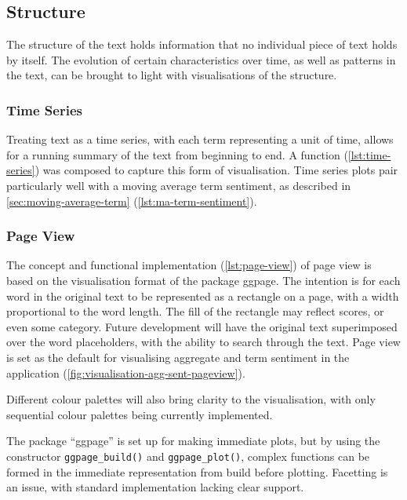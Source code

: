 \message{ !name(jason-cairns-dissertation.tex)}\documentclass[11pt, a4paper, titlepage]{report}
\begin{document}
\subsection{Structure}\label{sec:structure}

The structure of the text holds information that no individual piece
of text holds by itself. The evolution of certain characteristics over
time, as well as patterns in the text, can be brought to light with
visualisations of the structure.

\subsubsection{Time Series}\label{sec:time-series}

Treating text as a time series, with each term representing a unit of
time, allows for a running summary of the text from beginning to end.
A function (\cref{lst:time-series}) was composed to capture
this form of visualisation. Time series plots pair particularly well
with a moving average term sentiment, as described in
\cref{sec:moving-average-term}
(\cref{lst:ma-term-sentiment}).

\subsubsection{Page View}\label{sec:page-view}

The concept and functional implementation (\cref{lst:page-view}) of
page view is based on the visualisation format of the package ggpage.
The intention is for each word in the original text to be represented
as a rectangle on a page, with a width proportional to the word
length. The fill of the rectangle may reflect scores, or even some
category. Future development will have the original text superimposed
over the word placeholders, with the ability to search through the
text. Page view is set as the default for visualising aggregate and
term sentiment in the application
(\cref{fig:visualisation-agg-sent-pageview}).

Different
colour palettes will also bring clarity to the visualisation, with
only sequential colour palettes being currently implemented.

The package ``ggpage'' is set up for making immediate plots, but by
using the constructor \texttt{ggpage_build()} and
\texttt{ggpage_plot()}, complex functions can be formed in the
immediate representation from build before
plotting\autocite{hvitfeldt19ggpage}. Facetting is an issue, with
standard implementation lacking clear support.
\end{document}
